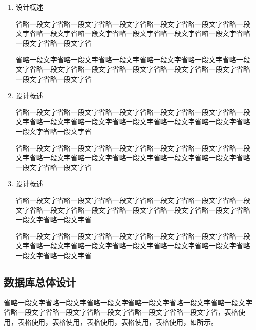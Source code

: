 	\begin{enumerate}[fullwidth,itemindent=2em,listparindent=2em]
	
		\item 设计概述
		
		省略一段文字省略一段文字省略一段文字省略一段文字省略一段文字省略一段文字省略一段文字省略一段文字省略一段文字省略一段文字省略一段文字省略一段文字省略一段文字省
		
		省略一段文字省略一段文字省略一段文字省略一段文字省略一段文字省略一段文字省略一段文字省略一段文字省略一段文字省略一段文字省略一段文字省略一段文字省略一段文字省
		
		\item 设计概述
		
		省略一段文字省略一段文字省略一段文字省略一段文字省略一段文字省略一段文字省略一段文字省略一段文字省略一段文字省略一段文字省略一段文字省略一段文字省略一段文字省
		
		省略一段文字省略一段文字省略一段文字省略一段文字省略一段文字省略一段文字省略一段文字省略一段文字省略一段文字省略一段文字省略一段文字省略一段文字省略一段文字省

		\item 设计概述
		
		省略一段文字省略一段文字省略一段文字省略一段文字省略一段文字省略一段文字省略一段文字省略一段文字省略一段文字省略一段文字省略一段文字省略一段文字省略一段文字省
		
		省略一段文字省略一段文字省略一段文字省略一段文字省略一段文字省略一段文字省略一段文字省略一段文字省略一段文字省略一段文字省略一段文字省略一段文字省略一段文字省

			
		

	\end{enumerate}

	\subsection{数据库总体设计}

		
		省略一段文字省略一段文字省略一段文字省略一段文字省略一段文字省略一段文字省略一段文字省略一段文字省略一段文字省略一段文字省略一段文字省，表格使用，表格使用，表格使用，表格使用，表格使用，表格使用，如所示。
	
